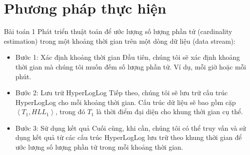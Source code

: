 \documentclass[10pt]{beamer}
\begin{document}
\section{Phương pháp thực hiện}
\begin{frame}[fragile]{Bài toán 1}
Phát triển thuật toán để ước lượng số lượng phần tử (cardinality estimation) trong 
một khoảng thời gian trên một dòng dữ liệu (data stream): 
\begin{itemize}
  \item Bước 1: Xác định khoảng thời gian
  Đầu tiên, chúng tôi sẽ xác định khoảng thời gian mà chúng tôi muốn đếm số lượng 
  phần tử. Ví dụ, mỗi giờ hoặc mỗi phút.
  \item Bước 2: Lưu trữ HyperLogLog
  Tiếp theo, chúng tôi sẽ lưu trữ cấu trúc HyperLogLog cho mỗi khoảng thời gian. 
  Cấu trúc dữ liệu sẽ bao gồm cặp $\left< T_1, HLL_1\right>$, trong đó $T_1$ là 
  thời điểm đại diện cho khung thời gian cụ thể.
  \item Bước 3: Sử dụng kết quả
  Cuối cùng, khi cần, chúng tôi có thể truy vấn và sử dụng kết quả từ các cấu trúc 
  HyperLogLog lưu trữ theo khung thời gian để ước lượng số lượng phần tử trong 
  mỗi khoảng thời gian.
\end{itemize}
\end{frame}
\end{document}

